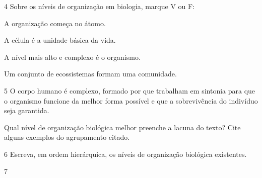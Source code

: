 \num{4}  Sobre os níveis de organização em biologia, marque V ou F:

\begin{boxlist}
\item A organização começa no átomo. 

\item A célula é a unidade básica da vida. 

\item A nível mais alto e complexo é o organismo. 

\item Um conjunto de ecossistemas formam uma comunidade. 
\end{boxlist}

\num{5}  O corpo humano é complexo, formado por \preencher
  que trabalham em sintonia para que o organismo funcione da melhor
  forma possível e que a sobrevivência do indivíduo seja garantida.


Qual nível de organização biológica melhor preenche a lacuna do texto?
Cite alguns exemplos do agrupamento citado.


\num{6}  Escreva, em ordem hierárquica, os níveis de organização biológica existentes.



\num{7}

